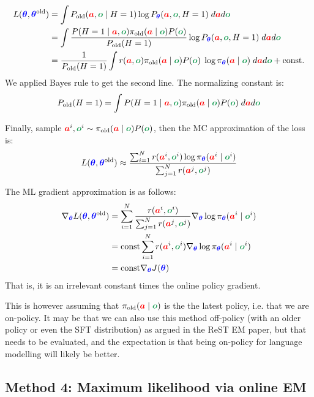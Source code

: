 \documentclass{article}
\newcommand{\colsym}[2]{\ensuremath{\textcolor{#1}{\boldsymbol{#2}}}}
\newcommand{\action}{\colsym{red}{a}}
\newcommand{\obs}{\colsym{ForestGreen}{o}}
\newcommand{\params}{\colsym{blue}{\theta}}
\begin{document}
\begin{align*}
L(\params, \params^{\text{old}}) &= \int P_{\text{old}}(\action, \obs \mid H=1) \log P_{\params}(\action, \obs, H=1) \; d\action d\obs
\\
&= \int \frac{P(H=1 \mid \action, \obs) \pi_{\text{old}}(\action \mid \obs) P(\obs)}{P_{\text{old}}(H=1)} \log P_{\params}(\action, \obs, H=1) \; d\action d\obs
\\
&=  \frac{1}{P_{\text{old}}(H=1)} \int r(\action, \obs) \pi_{\text{old}}(\action \mid \obs) P(\obs) \; \log \pi_{\params}(\action \mid \obs) \; d\action d\obs + \text{const.}
\end{align*}
We applied Bayes rule to get the second line. The normalizing constant is:
\[
P_{\text{old}}(H=1) = \int P(H=1 \mid \action, \obs) \pi_{\text{old}}(\action \mid \obs) P(\obs) \; d\action d\obs
\]

Finally, sample $\action^i, \obs^i \sim \pi_{\text{old}}(\action \mid \obs) P(\obs)$, then the MC approximation of the loss is:
\[
L(\params, \params^{\text{old}}) \approx \frac{\sum_{i=1}^N r(\action^i, \obs^i) \log \pi_{\params}(\action^i \mid \obs^i)}{\sum_{j=1}^N r(\action^j, \obs^j)}
\]

The ML gradient approximation is as follows:
\begin{align*}
\nabla_{\params} L(\params, \params^{\text{old}}) &= \sum_{i=1}^N \frac{r(\action^i, \obs^i)}{\sum_{j=1}^N r(\action^j, \obs^j)} \nabla_{\params} \log \pi_{\params}(\action^i \mid \obs^i)
\\
& = \text{const} \sum_{i=1}^N r(\action^i, \obs^i) \nabla_{\params} \log \pi_{\params}(\action^i \mid \obs^i)
\\
&= \text{const} \nabla_{\params} J(\params)
\end{align*}
That is, it is an irrelevant constant times the online policy gradient.

This is however assuming that $\pi_{\text{old}}(\action \mid \obs)$ is the the latest policy, i.e. that we are on-policy. It may be that we can also use this method off-policy (with an older policy or even the SFT distribution) as argued in the ReST EM paper, but that needs to be evaluated, and the expectation is that being on-policy for language modelling will likely be better.










\subsection{Method 4: Maximum likelihood via online EM}
\end{document}
